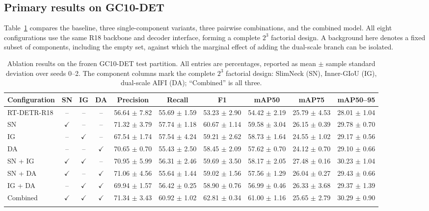 \documentclass[pdflatex,sn-mathphys-num,iicol]{sn-jnl}
\begin{document}
\subsection{Primary results on GC10-DET}\label{sec:gc10}

Table~\ref{tab:gc10ablation} compares the baseline, three single-component variants, three pairwise combinations, and the combined model. All eight configurations use the same R18 backbone and decoder interface, forming a complete $2^3$ factorial design. A background here denotes a fixed subset of components, including the empty set, against which the marginal effect of adding the dual-scale branch can be isolated.

\begin{table}[t]
\centering
\caption{Ablation results on the frozen GC10-DET test partition. All entries are percentages, reported as mean $\pm$ sample standard deviation over seeds 0--2. The component columns mark the complete $2^3$ factorial design: SlimNeck (SN), Inner-GIoU (IG), dual-scale AIFI (DA); ``Combined'' is all three.}
\label{tab:gc10ablation}
\scriptsize
\setlength{\tabcolsep}{3.5pt}
\begin{adjustbox}{max width=\textwidth}
\begin{tabular}{@{}lccccccccc@{}}
\toprule
Configuration & SN & IG & DA & Precision & Recall & F1 & mAP50 & mAP75 & mAP50--95 \\
\midrule
RT-DETR-R18 & -- & -- & -- & 56.64 $\pm$ 7.82 & 55.69 $\pm$ 1.59 & 53.23 $\pm$ 2.90 & 54.42 $\pm$ 2.19 & 25.79 $\pm$ 4.53 & 28.01 $\pm$ 1.04 \\
SN & $\checkmark$ & -- & -- & 71.32 $\pm$ 3.79 & 57.74 $\pm$ 1.18 & 60.67 $\pm$ 1.14 & 59.58 $\pm$ 3.04 & 26.15 $\pm$ 0.39 & 29.78 $\pm$ 0.70 \\
IG & -- & $\checkmark$ & -- & 67.54 $\pm$ 1.74 & 57.54 $\pm$ 4.24 & 59.21 $\pm$ 2.62 & 58.73 $\pm$ 1.64 & 24.55 $\pm$ 1.02 & 29.17 $\pm$ 0.56 \\
DA & -- & -- & $\checkmark$ & 70.65 $\pm$ 0.70 & 55.43 $\pm$ 2.50 & 58.45 $\pm$ 2.09 & 57.62 $\pm$ 0.70 & 24.12 $\pm$ 0.70 & 29.10 $\pm$ 0.66 \\
SN + IG & $\checkmark$ & $\checkmark$ & -- & 70.95 $\pm$ 5.99 & 56.31 $\pm$ 2.46 & 59.69 $\pm$ 3.50 & 58.17 $\pm$ 2.05 & 27.48 $\pm$ 0.16 & 30.23 $\pm$ 1.04 \\
SN + DA & $\checkmark$ & -- & $\checkmark$ & 71.06 $\pm$ 4.56 & 55.64 $\pm$ 1.44 & 59.02 $\pm$ 1.56 & 57.56 $\pm$ 1.29 & 26.04 $\pm$ 0.27 & 29.43 $\pm$ 0.66 \\
IG + DA & -- & $\checkmark$ & $\checkmark$ & 69.94 $\pm$ 1.57 & 56.42 $\pm$ 0.25 & 58.90 $\pm$ 0.76 & 56.99 $\pm$ 0.46 & 26.33 $\pm$ 3.68 & 29.37 $\pm$ 1.39 \\
Combined & $\checkmark$ & $\checkmark$ & $\checkmark$ & 71.34 $\pm$ 3.43 & 60.92 $\pm$ 1.02 & 62.81 $\pm$ 0.34 & 61.00 $\pm$ 1.16 & 25.65 $\pm$ 2.79 & 30.29 $\pm$ 0.90 \\
\botrule
\end{tabular}
\end{adjustbox}
\end{table}
\end{document}
